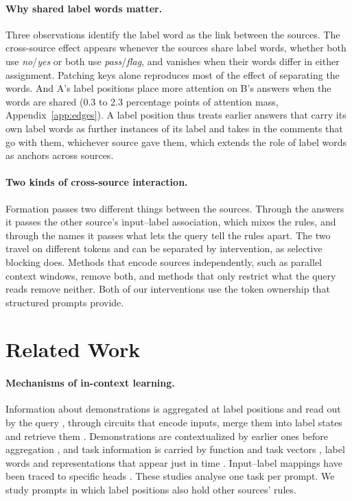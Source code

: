 \documentclass[11pt]{article}
\newcommand{\lw}[1]{\textit{#1}}
\begin{document}
\paragraph{Why shared label words matter.}
Three observations identify the label word as the link between the sources.
The cross-source effect appears whenever the sources share label words, whether both use \lw{no}/\lw{yes} or both use \lw{pass}/\lw{flag}, and vanishes when their words differ in either assignment.
Patching keys alone reproduces most of the effect of separating the words.
And A's label positions place more attention on B's answers when the words are shared (0.3 to 2.3 percentage points of attention mass, Appendix~\ref{app:edges}).
A label position thus treats earlier answers that carry its own label words as further instances of its label and takes in the comments that go with them, whichever source gave them, which extends the role of label words as anchors \citep{wang-etal-2023-label,zheng-etal-2026-label} across sources.

\paragraph{Two kinds of cross-source interaction.}
Formation passes two different things between the sources.
Through the answers it passes the other source's input--label association, which mixes the rules, and through the names it passes what lets the query tell the rules apart.
The two travel on different tokens and can be separated by intervention, as selective blocking does.
Methods that encode sources independently, such as parallel context windows, remove both, and methods that only restrict what the query reads remove neither.
Both of our interventions use the token ownership that structured prompts provide.

\section{Related Work}
\label{sec:related}

\paragraph{Mechanisms of in-context learning.}
Information about demonstrations is aggregated at label positions and read out by the query \citep{wang-etal-2023-label}, through circuits that encode inputs, merge them into label states and retrieve them \citep{cho2025revisitingincontextlearninginference,cho2026mechanismtaskorientedinformationremoval}.
Demonstrations are contextualized by earlier ones before aggregation \citep{bakalova2025contextualizethenaggregatecircuitsincontextlearning}, and task information is carried by function and task vectors \citep{todd2024function,hendel-etal-2023-context,wang2026fewshotexamplesaddup}, label words \citep{zheng-etal-2026-label} and representations that appear just in time \citep{li2025justintimedistributedtaskrepresentations}.
Input--label mappings have been traced to specific heads \citep{sun-etal-2025-interpret,yu-ananiadou-2024-large,olsson2022context,crosbie-shutova-2025-induction}.
These studies analyse one task per prompt. We study prompts in which label positions also hold other sources' rules.
\end{document}
